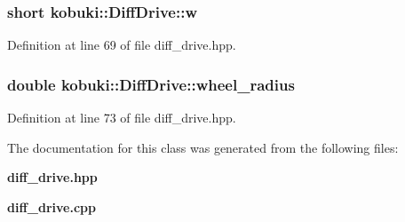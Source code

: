 \subsubsection[{w}]{\setlength{\rightskip}{0pt plus 5cm}short {\bf kobuki\-::\-Diff\-Drive\-::w}\hspace{0.3cm}{\ttfamily  [private]}}\label{classkobuki_1_1DiffDrive_a3f552c92800750cafb8f7e2e8b27191a}


\-Definition at line 69 of file diff\-\_\-drive.\-hpp.

\subsubsection[{wheel\-\_\-radius}]{\setlength{\rightskip}{0pt plus 5cm}double {\bf kobuki\-::\-Diff\-Drive\-::wheel\-\_\-radius}\hspace{0.3cm}{\ttfamily  [private]}}\label{classkobuki_1_1DiffDrive_a8074f33732a3dd52f6ba2fc00223727d}


\-Definition at line 73 of file diff\-\_\-drive.\-hpp.



\-The documentation for this class was generated from the following files\-:\begin{DoxyCompactItemize}
\item 
{\bf diff\-\_\-drive.\-hpp}\item 
{\bf diff\-\_\-drive.\-cpp}\end{DoxyCompactItemize}
